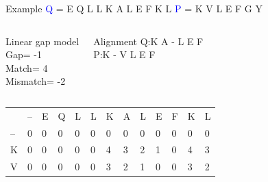 \documentclass{bredelebeamer}
\begin{document}
\begin{frame}{Example}
 \centering
 \textcolor{blue}{Q} = E Q L L K A L E F K L \quad \textcolor{blue}{P} = K V L E F G Y
\begin{columns}
\begin{block}{Linear gap model} \\
Gap= -1 \\
Match= 4 \\
Mismatch= -2
\end{block}
\begin{block}{Alignment}
Q:\quad K A - L E F \\
P:\quad K - V L E F
\end{block}
\end{columns}

\begin{table}[]
\centering
\begin{tabular}{*{13}{p{0.4cm}}}
                        & --                     & E                      & Q                      & L                      & L                      & K                      & A                      & L                      &E                       & F                                               & K                       & L                       \\ \cline{2-13} 
\multicolumn{1}{l|}{--} & \multicolumn{1}{l|}{0} & \multicolumn{1}{l|}{0} & \multicolumn{1}{l|}{0} & \multicolumn{1}{l|}{0} & \multicolumn{1}{l|}{\cellcolor[HTML]{00FF00}0} & \multicolumn{1}{l|}{0} & \multicolumn{1}{l|}{0} & \multicolumn{1}{l|}{0} & \multicolumn{1}{l|}{0}  & \multicolumn{1}{l|}{0}                          & \multicolumn{1}{l|}{0}  & \multicolumn{1}{l|}{0}  \\ \cline{2-13} 
\multicolumn{1}{l|}{K}  & \multicolumn{1}{l|}{0} & \multicolumn{1}{l|}{0} & \multicolumn{1}{l|}{0} & \multicolumn{1}{l|}{0} & \multicolumn{1}{l|}{0} & \multicolumn{1}{l|}{\cellcolor[HTML]{00FF00}4} & \multicolumn{1}{l|}{\cellcolor[HTML]{00FF00}3} & \multicolumn{1}{l|}{2} & \multicolumn{1}{l|}{1}  & \multicolumn{1}{l|}{0}                          & \multicolumn{1}{l|}{4}  & \multicolumn{1}{l|}{3}  \\ \cline{2-13}  %
\multicolumn{1}{l|}{V}  & \multicolumn{1}{l|}{0} & \multicolumn{1}{l|}{0} & \multicolumn{1}{l|}{0} & \multicolumn{1}{l|}{0} & \multicolumn{1}{l|}{0} & \multicolumn{1}{l|}{3} & \multicolumn{1}{l|}{\cellcolor[HTML]{00FF00}2} & \multicolumn{1}{l|}{1} & \multicolumn{1}{l|}{0}  & \multicolumn{1}{l|}{0}                          & \multicolumn{1}{l|}{3}  & \multicolumn{1}{l|}{2}  \\ \cline{2-13} 

\end{tabular}
\end{table}
\end{frame}
\end{document}
